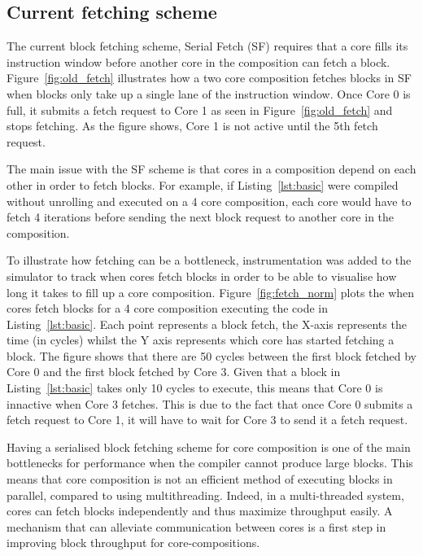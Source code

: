 \subsection{Current fetching scheme}
	
The current block fetching scheme, Serial Fetch (SF) requires that a core fills its instruction window before another core in the composition can fetch a block.
Figure~\ref{fig:old_fetch} illustrates how a two core composition fetches blocks in SF when blocks only take up a single lane of the instruction window.
Once Core 0 is full, it submits a fetch request to Core 1 as seen in Figure~\ref{fig:old_fetch} and stops fetching.
As the figure shows, Core 1 is not active until the 5th fetch request.

The main issue with the SF scheme is that cores in a composition depend on each other in order to fetch blocks.
For example, if Listing~\ref{lst:basic} were compiled without unrolling and executed on a 4 core composition, each core would have to fetch 4 iterations before sending the next block request to another core in the composition.

To illustrate how fetching can be a bottleneck, instrumentation was added to the simulator to track when cores fetch blocks in order to be able to visualise how long it takes to fill up a core composition.
Figure~\ref{fig:fetch_norm} plots the when cores fetch blocks for a 4 core composition executing the code in Listing~\ref{lst:basic}.
Each point represents a block fetch, the X-axis represents the time (in cycles) whilst the Y axis represents which core has started fetching a block.
The figure shows that there are 50 cycles between the first block fetched by Core 0 and the first block fetched by Core 3.
Given that a block in Listing~\ref{lst:basic} takes only 10 cycles to execute, this means that Core 0 is innactive when Core 3 fetches.
This is due to the fact that once Core 0 submits a fetch request to Core 1, it will have to wait for Core 3 to send it a fetch request.

Having a serialised block fetching scheme for core composition is one of the main bottlenecks for performance when the compiler cannot produce large blocks.
This means that core composition is not an efficient method of executing blocks in parallel, compared to using multithreading.
Indeed, in a multi-threaded system, cores can fetch blocks independently and thus maximize throughput easily.
A mechanism that can alleviate communication between cores is a first step in improving block throughput for core-compositions.

